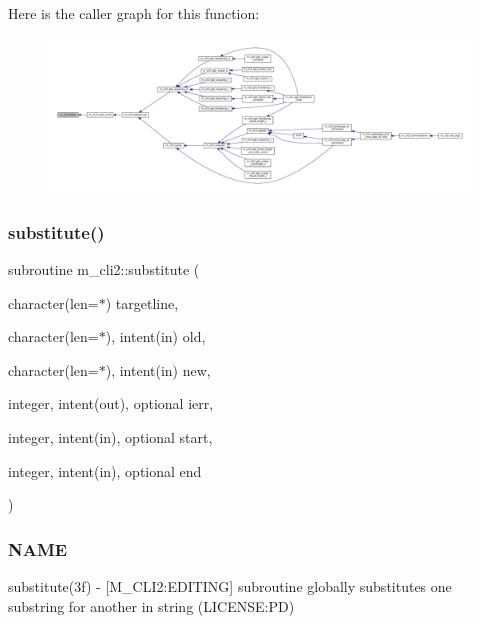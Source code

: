 Here is the caller graph for this function\+:\nopagebreak
\begin{figure}[H]
\begin{center}
\leavevmode
\includegraphics[width=350pt]{namespacem__cli2_a752fd074abce57e636e4572b3e55db3a_icgraph}
\end{center}
\end{figure}
\mbox{\label{namespacem__cli2_a76af7f7c39e6755e024890d85d488704}} 
\subsubsection{\texorpdfstring{substitute()}{substitute()}}
{\footnotesize\ttfamily subroutine m\+\_\+cli2\+::substitute (\begin{DoxyParamCaption}\item[{character(len=$\ast$)}]{targetline,  }\item[{character(len=$\ast$), intent(in)}]{old,  }\item[{character(len=$\ast$), intent(in)}]{new,  }\item[{integer, intent(out), optional}]{ierr,  }\item[{integer, intent(in), optional}]{start,  }\item[{integer, intent(in), optional}]{end }\end{DoxyParamCaption})\hspace{0.3cm}{\ttfamily [private]}}



\subsubsection*{N\+A\+ME}

substitute(3f) -\/ \mbox{[}M\+\_\+\+C\+L\+I2\+:E\+D\+I\+T\+I\+NG\mbox{]} subroutine globally substitutes one substring for another in string (L\+I\+C\+E\+N\+SE\+:PD) 

